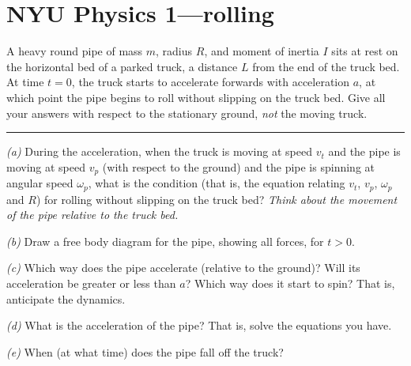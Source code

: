 \documentclass[12pt]{article}
\begin{document}
\thispagestyle{empty}

\section*{NYU Physics 1---rolling}

A heavy round pipe of mass $m$, radius $R$, and moment of inertia $I$
sits at rest on the horizontal bed of a parked truck, a distance $L$
from the end of the truck bed.  At time $t=0$, the truck starts to
accelerate forwards with acceleration $a$, at which point the pipe
begins to roll without slipping on the truck bed.  Give all your
answers with respect to the stationary ground, {\em not} the moving
truck.
\\ \rule{0.3\textwidth}{0pt}

\textsl{(a)} During the acceleration, when the truck is moving at
speed $v_t$ and the pipe is moving at speed $v_p$ (with respect to the
ground) and the pipe is spinning at angular speed $\omega_p$, what is
the condition (that is, the equation relating $v_t$, $v_p$, $\omega_p$
and $R$) for rolling without slipping on the truck bed?  \emph{Think
about the movement of the pipe relative to the truck bed.}

\textsl{(b)} Draw a free body diagram for the pipe, showing all
forces, for $t>0$.

\textsl{(c)} Which way does the pipe accelerate (relative to the
ground)?  Will its acceleration be greater or less than $a$?  Which
way does it start to spin?  That is, anticipate the dynamics.

\textsl{(d)} What is the acceleration of the pipe?  That is, solve the
equations you have.

\textsl{(e)} When (at what time) does the pipe fall off the truck?
\end{document}
